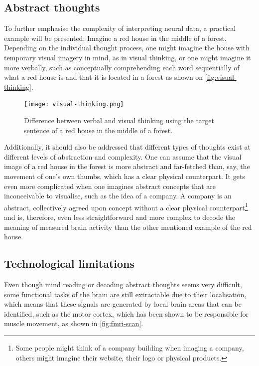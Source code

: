 \subsection{Abstract thoughts}
\label{chapter2-abstract-thoughts}

To further emphasise the complexity of interpreting neural data, a practical example will be presented: Imagine a red house in the middle of a forest. Depending on the individual thought process, one might imagine the house with temporary visual imagery in mind, as in visual thinking, or one might imagine it more verbally, such as conceptually comprehending each word sequentially of what a red house is and that it is located in a forest \citep{amit_asymmetrical_2017} as shown on \autoref{fig:visual-thinking}.

\begin{figure}[ht]
  \centering
  \texttt{[image: visual-thinking.png]}
  \caption{Difference between verbal and visual thinking using the target sentence of a red house in the middle of a forest.}
  \label{fig:visual-thinking}
\end{figure}

Additionally, it should also be addressed that different types of thoughts exist at different levels of abstraction and complexity. One can assume that the visual image of a red house in the forest is more abstract and far-fetched than, say, the movement of one's own thumbs, which has a clear physical counterpart. It gets even more complicated when one imagines abstract concepts that are inconceivable to visualise, such as the idea of a company. A company is an abstract, collectively agreed upon concept without a clear physical counterpart\footnote{Some people might think of a company building when imaging a company, others might imagine their website, their logo or physical products.} and is, therefore, even less straightforward and more complex to decode the meaning of measured brain activity than the other mentioned example of the red house.

\subsection{Technological limitations}
\label{chapter2-technological-limitations}

Even though mind reading or decoding abstract thoughts seems very difficult, some functional tasks of the brain are still extractable due to their localisation, which means that these signals are generated by local brain areas that can be identified, such as the motor cortex, which has been shown to be responsible for muscle movement, as shown in \autoref{fig:fmri-scan}.

